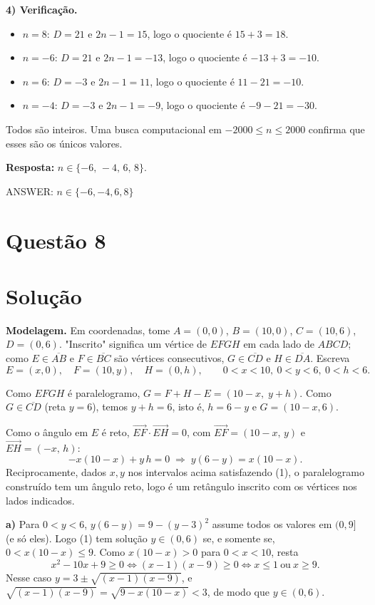 \documentclass{article}%
\begin{document}
\textbf{4) Verificação.}
\begin{itemize}
\item $n=8$: $D=21$ e $2n-1=15$, logo o quociente é $15+3=18$.
\item $n=-6$: $D=21$ e $2n-1=-13$, logo o quociente é $-13+3=-10$.
\item $n=6$: $D=-3$ e $2n-1=11$, logo o quociente é $11-21=-10$.
\item $n=-4$: $D=-3$ e $2n-1=-9$, logo o quociente é $-9-21=-30$.
\end{itemize}
Todos são inteiros. Uma busca computacional em $-2000\le n\le 2000$ confirma que esses são os únicos valores.

\textbf{Resposta:} $n\in\{-6,\,-4,\,6,\,8\}$.

ANSWER: $n\in\{-6,-4,6,8\}$%
\newpage%
\section*{Questão 8}

\section*{Solução}

\textbf{Modelagem.} Em coordenadas, tome $A=(0,0)$, $B=(10,0)$, $C=(10,6)$, $D=(0,6)$. "Inscrito" significa um vértice de $EFGH$ em cada lado de $ABCD$; como $E\in\overline{AB}$ e $F\in\overline{BC}$ são vértices consecutivos, $G\in\overline{CD}$ e $H\in\overline{DA}$. Escreva
\[
E=(x,0),\quad F=(10,y),\quad H=(0,h),\qquad 0<x<10,\ 0<y<6,\ 0<h<6 .
\]

Como $EFGH$ é paralelogramo, $G=F+H-E=(10-x,\;y+h)$. Como $G\in\overline{CD}$ (reta $y=6$), temos $y+h=6$, isto é, $h=6-y$ e $G=(10-x,6)$.

Como o ângulo em $E$ é reto, $\overrightarrow{EF}\cdot\overrightarrow{EH}=0$, com $\overrightarrow{EF}=(10-x,\,y)$ e $\overrightarrow{EH}=(-x,\,h)$:
\[
-x(10-x)+y\,h=0 \;\Longrightarrow\; y(6-y)=x(10-x). \tag{1}
\]
Reciprocamente, dados $x,y$ nos intervalos acima satisfazendo (1), o paralelogramo construído tem um ângulo reto, logo é um retângulo inscrito com os vértices nos lados indicados.

\textbf{a)} Para $0<y<6$, $y(6-y)=9-(y-3)^2$ assume todos os valores em $(0,9]$ (e só eles). Logo (1) tem solução $y\in(0,6)$ se, e somente se, $0<x(10-x)\le 9$. Como $x(10-x)>0$ para $0<x<10$, resta
\[
x^2-10x+9\ge 0 \iff (x-1)(x-9)\ge 0 \iff x\le 1 \ \text{ou}\ x\ge 9 .
\]
Nesse caso $y=3\pm\sqrt{(x-1)(x-9)}$, e $\sqrt{(x-1)(x-9)}=\sqrt{9-x(10-x)}<3$, de modo que $y\in(0,6)$.
\end{document}
